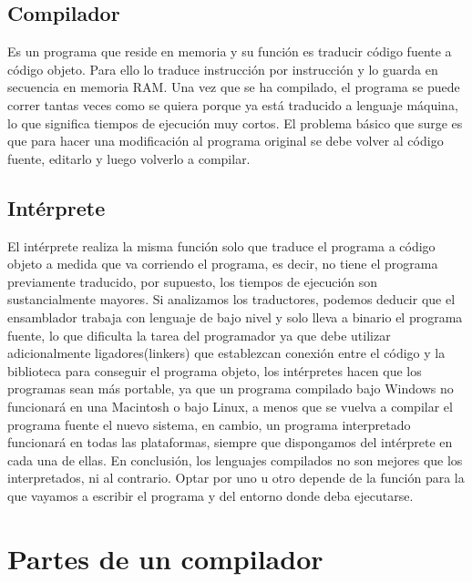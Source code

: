 \subsection{Compilador}

Es un programa que reside en memoria y su función es traducir código fuente a código objeto. Para ello lo traduce instrucción por instrucción y lo guarda en secuencia en memoria RAM. Una vez que se ha compilado, el programa se puede correr tantas veces como se quiera porque ya está  traducido a lenguaje máquina, lo que significa tiempos de ejecución muy cortos. El problema básico que surge es que para hacer una modificación al programa original se debe volver al código fuente, editarlo y luego volverlo a compilar.

\subsection{Intérprete}

El intérprete realiza la misma función solo que traduce el programa a código objeto a medida que va corriendo el programa, es decir, no tiene el programa previamente traducido, por supuesto, los tiempos de ejecución son sustancialmente mayores.
Si analizamos los traductores, podemos deducir que el ensamblador  trabaja con lenguaje de bajo nivel y solo lleva a binario el programa fuente, lo que dificulta la tarea del programador ya que debe utilizar adicionalmente ligadores(linkers) que establezcan conexión entre el código y la biblioteca  para conseguir el programa objeto, los intérpretes hacen que los programas sean más portable, ya que un programa compilado bajo Windows no funcionará en una Macintosh o bajo Linux, a menos que se vuelva a compilar el programa fuente el nuevo sistema, en cambio, un programa interpretado funcionará en todas las plataformas, siempre que dispongamos del intérprete en cada una de ellas.
En conclusión, los lenguajes compilados no son mejores que los interpretados, ni al contrario. Optar por uno u otro depende de la función para la que vayamos a escribir el programa y del entorno donde deba ejecutarse.

\section{Partes de un compilador}

